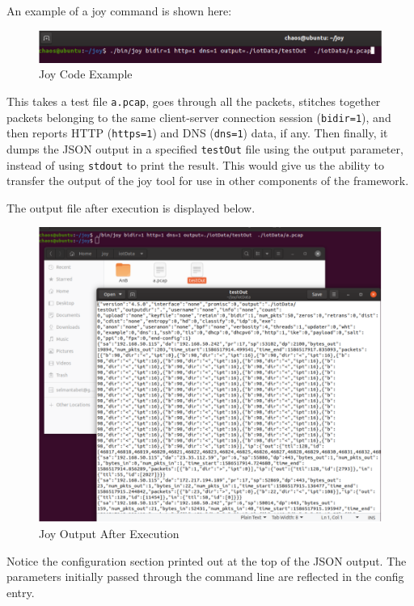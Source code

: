 \documentclass{article}
\begin{document}
An example of a joy command is shown here:

\begin{figure}[!ht]
    \centering
    \includegraphics[width=13cm]{joy1.PNG}
    \caption{Joy Code Example} 
\end{figure}

This takes a test file \texttt{a.pcap}, goes through all the packets, stitches together packets belonging to the same client-server connection session (\texttt{bidir=1}), and then reports HTTP (\texttt{https=1}) and DNS (\texttt{dns=1}) data, if any. Then finally, it dumps the JSON output in a specified \texttt{testOut} file using the output parameter, instead of using \texttt{stdout} to print the result. This would give us the ability to transfer the output of the joy tool for use in other components of the framework.\newline

The output file after execution is displayed below.

\begin{figure}[!ht]
    \centering
    \includegraphics[width=15cm]{joy2.PNG}
    \caption{Joy Output After Execution} 
\end{figure}

Notice the configuration section printed out at the top of the JSON output. The parameters initially passed through the command line are reflected in the config entry.
\end{document}
